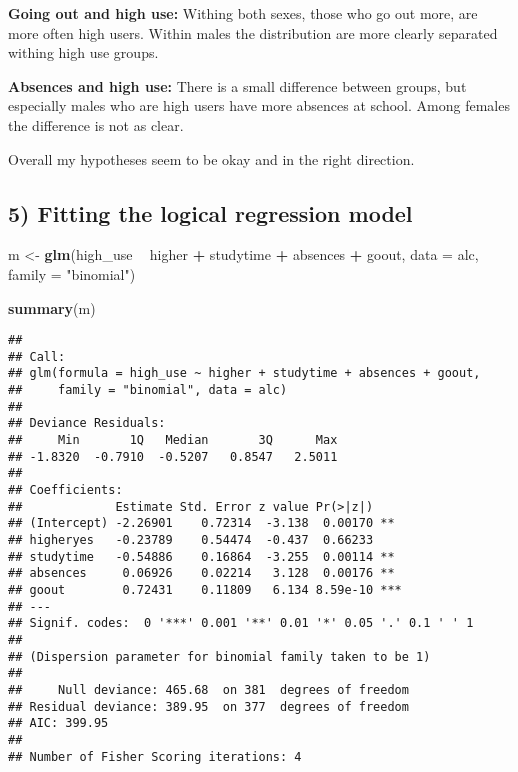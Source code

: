 \documentclass[]{article}
\newenvironment{Shaded}{\begin{snugshade}}{\end{snugshade}}
\newcommand{\KeywordTok}[1]{\textcolor[rgb]{0.13,0.29,0.53}{\textbf{#1}}}
\newcommand{\DataTypeTok}[1]{\textcolor[rgb]{0.13,0.29,0.53}{#1}}
\newcommand{\StringTok}[1]{\textcolor[rgb]{0.31,0.60,0.02}{#1}}
\newcommand{\OperatorTok}[1]{\textcolor[rgb]{0.81,0.36,0.00}{\textbf{#1}}}
\newcommand{\NormalTok}[1]{#1}
\begin{document}
\textbf{Going out and high use:} Withing both sexes, those who go out
more, are more often high users. Within males the distribution are more
clearly separated withing high use groups.

\textbf{Absences and high use:} There is a small difference between
groups, but especially males who are high users have more absences at
school. Among females the difference is not as clear.

Overall my hypotheses seem to be okay and in the right direction.

\subsection{5) Fitting the logical regression
model}\label{fitting-the-logical-regression-model}

\begin{Shaded}
\begin{Highlighting}[]
\NormalTok{m <-}\StringTok{ }\KeywordTok{glm}\NormalTok{(high_use }\OperatorTok{~}\StringTok{ }\NormalTok{higher }\OperatorTok{+}\StringTok{ }\NormalTok{studytime }\OperatorTok{+}\StringTok{ }\NormalTok{absences }\OperatorTok{+}\StringTok{ }\NormalTok{goout, }\DataTypeTok{data =}\NormalTok{ alc, }\DataTypeTok{family =} \StringTok{"binomial"}\NormalTok{)}

\KeywordTok{summary}\NormalTok{(m)}
\end{Highlighting}
\end{Shaded}

\begin{verbatim}
## 
## Call:
## glm(formula = high_use ~ higher + studytime + absences + goout, 
##     family = "binomial", data = alc)
## 
## Deviance Residuals: 
##     Min       1Q   Median       3Q      Max  
## -1.8320  -0.7910  -0.5207   0.8547   2.5011  
## 
## Coefficients:
##             Estimate Std. Error z value Pr(>|z|)    
## (Intercept) -2.26901    0.72314  -3.138  0.00170 ** 
## higheryes   -0.23789    0.54474  -0.437  0.66233    
## studytime   -0.54886    0.16864  -3.255  0.00114 ** 
## absences     0.06926    0.02214   3.128  0.00176 ** 
## goout        0.72431    0.11809   6.134 8.59e-10 ***
## ---
## Signif. codes:  0 '***' 0.001 '**' 0.01 '*' 0.05 '.' 0.1 ' ' 1
## 
## (Dispersion parameter for binomial family taken to be 1)
## 
##     Null deviance: 465.68  on 381  degrees of freedom
## Residual deviance: 389.95  on 377  degrees of freedom
## AIC: 399.95
## 
## Number of Fisher Scoring iterations: 4
\end{verbatim}
\end{document}
